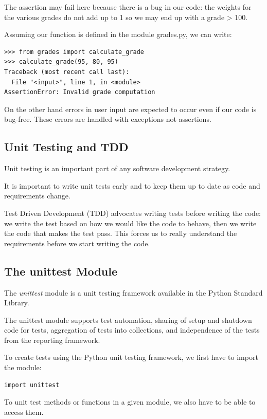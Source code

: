 \documentclass{article}
\begin{document}
The assertion may fail here because there is a bug in our code:  the weights for the various grades do not add up to 1 so we may end up with a grade > 100.

Assuming our function is defined in the module grades.py, we can write:

\begin{lstlisting}
>>> from grades import calculate_grade
>>> calculate_grade(95, 80, 95)
Traceback (most recent call last):
  File "<input>", line 1, in <module>
AssertionError: Invalid grade computation
\end{lstlisting}

On the other hand errors in user input are expected to occur even if our code is bug-free.  These errors are handled with exceptions not assertions.

\subsection{Unit Testing and TDD}
Unit testing is an important part of any software development strategy. 

It is important to write unit tests early and to keep them up to date as code and requirements change. 

Test Driven Development (TDD) advocates writing tests before writing  the code:  we write the test based on how we would like the code to behave, then we write the code that makes the test pass. This forces us to really understand the requirements before we start writing the code.

\subsection{The unittest Module}
The \textit{unittest} module is a  unit testing framework available in the Python Standard Library.

The unittest module supports test automation, sharing of setup and shutdown code for tests, aggregation of tests into collections, and independence of the tests from the reporting framework.

To create tests using the Python unit testing framework, we first have to import the module:

\begin{lstlisting}
import unittest 
\end{lstlisting}

To unit test methods or functions in a given module, we also have to be able to access them.
\end{document}
